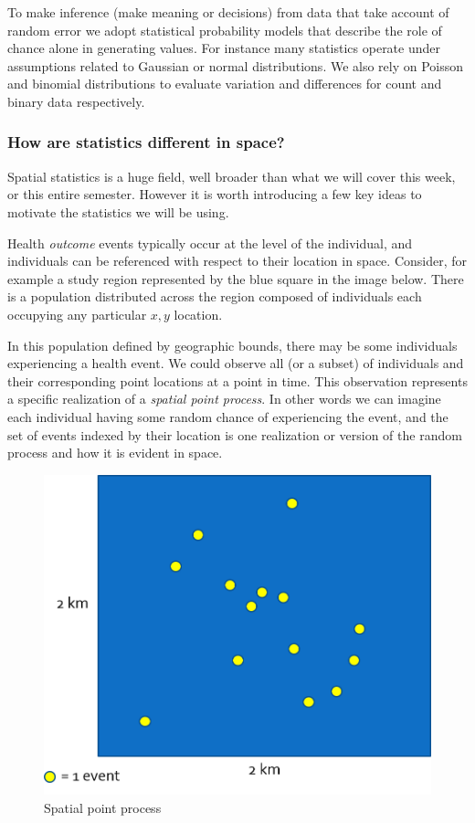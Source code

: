\documentclass[
]{book}
\begin{document}
To make inference (make meaning or decisions) from data that take account of random error we adopt statistical probability models that describe the role of chance alone in generating values. For instance many statistics operate under assumptions related to Gaussian or normal distributions. We also rely on Poisson and binomial distributions to evaluate variation and differences for count and binary data respectively.

\hypertarget{how-are-statistics-different-in-space}{%
\subsubsection{How are statistics different in space?}\label{how-are-statistics-different-in-space}}

Spatial statistics is a huge field, well broader than what we will cover this week, or this entire semester. However it is worth introducing a few key ideas to motivate the statistics we will be using.

Health \emph{outcome} events typically occur at the level of the individual, and individuals can be referenced with respect to their location in space. Consider, for example a study region represented by the blue square in the image below. There is a population distributed across the region composed of individuals each occupying any particular \(x,y\) location.

In this population defined by geographic bounds, there may be some individuals experiencing a health event. We could observe all (or a subset) of individuals and their corresponding point locations at a point in time. This observation represents a specific realization of a \emph{spatial point process}. In other words we can imagine each individual having some random chance of experiencing the event, and the set of events indexed by their location is one realization or version of the random process and how it is evident in space.

\begin{figure}
\centering
\includegraphics{images/point-process.png}
\caption{\label{fig:unnamed-chunk-3}Spatial point process}
\end{figure}
\end{document}
